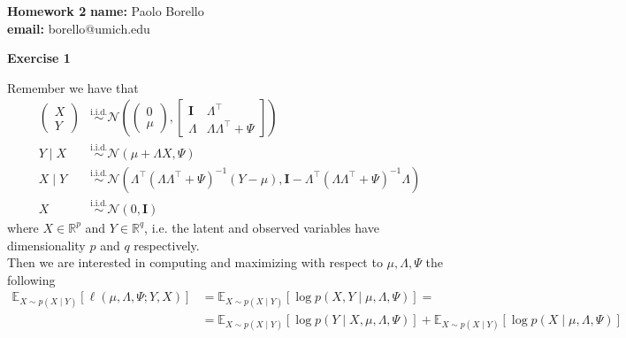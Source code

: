 \documentclass[10pt,notitlepage]{article}
\newcommand{\MBlue}[1]{{\color{MBlue}#1}}
\newcommand{\mean}[2][]{\mathbb{E}_{#1}\left[#2\right]}
\newcommand{\Id}{\mathbf{I}}
\begin{document}
	\begin{center}
		\huge{\MBlue{\textbf{Homework 2}}}		
		\vskip20pt
		\large{
			\textbf{name:} Paolo Borello\\
            \textbf{email:} borello@umich.edu}
	\end{center}

    \vskip20pt
    \noindent
    \textbf{\large \MBlue{Exercise 1}}
    \vskip10pt
    \noindent
	\begin{exercise}[Solution]
        Remember we have that 
        \begin{align*}
            \begin{pmatrix}
                X \\ 
                Y
            \end{pmatrix} &\overset{\text{i.i.d.}}{\sim} \mathcal{N}\left(
            \begin{pmatrix}
                0 \\ 
                \mu
            \end{pmatrix},
            \begin{bmatrix}
                \Id & \Lambda^\top \\
                \Lambda & \Lambda\Lambda^\top + \Psi
            \end{bmatrix}
            \right)\\
            Y\mid X &\overset{\text{i.i.d.}}{\sim}\mathcal{N}\left(\mu+\Lambda X, \Psi\right)\\
            X\mid Y &\overset{\text{i.i.d.}}{\sim}\mathcal{N}\left(\Lambda^\top\left(\Lambda\Lambda^\top+\Psi\right)^{-1}\left(Y-\mu\right), \Id-\Lambda^\top\left(\Lambda\Lambda^\top+\Psi\right)^{-1}\Lambda\right)\\
            X&\overset{\text{i.i.d.}}{\sim}\mathcal{N}\left(0, \Id\right)
        \end{align*}
        where $X\in\mathbb{R}^p$ and $Y\in\mathbb{R}^q$, i.e. the latent and observed variables have dimensionality $p$ and  $q$ respectively.\\
        Then we are interested in computing and maximizing with respect to $\mu,\Lambda,\Psi$ the following
        \begin{align*}
            \mean[X\sim p\left(X\mid Y\right)]{\ell\left(\mu,\Lambda,\Psi;Y,X\right)} &= \mean[X\sim p\left(X\mid Y\right)]{\log p\left(X,Y\mid \mu, \Lambda,\Psi\right)} = \\
            &= \mean[X\sim p\left(X\mid Y\right)]{\log p\left(Y\mid X,\mu, \Lambda,\Psi\right)} + \mean[X\sim p\left(X\mid Y\right)]{\log p\left(X\mid\mu, \Lambda,\Psi\right)}

\end{align*}
\end{exercise}
\end{document}
